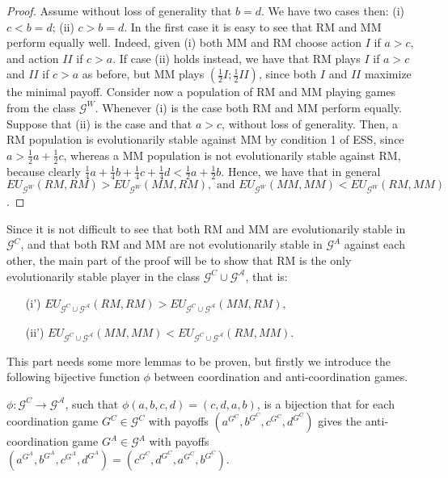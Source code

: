 \documentclass[fleqn,reqno,11pt]{article}
\begin{document}
\begin{proof}
Assume without loss of generality that $b=d$. We have
two cases then: (i) $c<b=d$; (ii) $c>b=d$. In the first case it
is easy to see that RM and MM perform equally well. Indeed, given
(i) both MM and RM choose action $I$ if $a>c$, and action $II$
if $c>a$. If case (ii) holds instead, we have that RM plays $I$
if $a>c$ and $II$ if $c>a$ as before, but MM plays $(\frac{1}{2}I;\frac{1}{2}II)$,
since both $I$ and $II$ maximize the minimal payoff. Consider now
a population of RM and MM playing games from the class $\mathcal{G}^{W}$.
Whenever (i) is the case both RM and MM perform equally. Suppose that
(ii) is the case and that $a>c$, without loss of generality. Then,
a RM population is evolutionarily stable against MM by condition 1
of ESS, since $a>\frac{1}{2}a+\frac{1}{2}c$, whereas a MM population
is not evolutionarily stable against RM, because clearly $\frac{1}{4}a+\frac{1}{4}b+\frac{1}{4}c+\frac{1}{4}d<\frac{1}{2}a+\frac{1}{2}b$.
Hence, we have that in general $EU_{\mathcal{G}^{W}}(RM,RM)>EU_{\mathcal{G}^{W}}(MM,RM),\mbox{ and }EU_{\mathcal{G}^{W}}(MM,MM)<EU_{\mathcal{G}^{W}}(RM,MM)$.
\end{proof}

\medskip{}


Since it is not difficult to see that both RM and MM are evolutionarily
stable in $\mathcal{G}^{C}$, and that both RM and MM are not evolutionarily
stable in $\mathcal{G}^{A}$ against each other, the main part of
the proof will be to show that RM is the only evolutionarily stable
player in the class $\mathcal{G}^{C}\cup\mathcal{G^{A}}$, that is:
\begin{itemize}
\item[(i')] $EU_{\mathcal{G}^{C}\cup\mathcal{G^{A}}}(RM,RM)>EU_{\mathcal{G}^{C}\cup\mathcal{G^{A}}}(MM,RM),$
\item[(ii')] $EU_{\mathcal{G}^{C}\cup\mathcal{G^{A}}}(MM,MM)<EU_{\mathcal{G}^{C}\cup\mathcal{G^{A}}}(RM,MM).$
\end{itemize}


\noindent This part needs some more lemmas to be proven, but firstly we introduce
the following bijective function $\phi$ between coordination and
anti-coordination games.

\medskip{}

\begin{definition}[$\phi$]
$\phi:\mathcal{G}^{C}\rightarrow\mathcal{G^{A}}$,
such that $\phi(a,b,c,d)=(c,d,a,b)$, is a bijection that for each
coordination game $G^{C}\in\mathcal{G}^{C}$ with payoffs $(a^{G^{C}},b^{G^{C}},c^{G^{C}},d^{G^{C}})$
gives the anti-coordination game $G^{A}\in\mathcal{G}^{A}$ with payoffs
$(a^{G^{A}},b^{G^{A}},c^{G^{A}},d^{G^{A}})=(c^{G^{C}},d^{G^{C}},a^{G^{C}},b^{G^{C}})$.
\end{definition}
\end{document}
